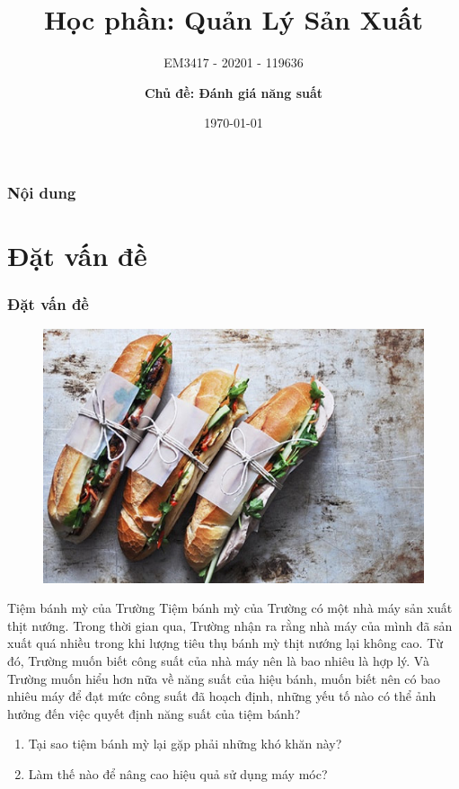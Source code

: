 \documentclass[10pt]{beamer}
\title[Đánh giá năng suất]{Học phần: \textbf{Quản Lý Sản Xuất}}
\subtitle{EM3417 - 20201 - 119636}
\author[EM3417 - 20201 - 119636]{\large {\textbf{Chủ đề: Đánh giá năng suất}}}
\institute[Nhóm 2]{\large {Nhóm 2}}
\date{\today}
\begin{document}
\frame{\titlepage\transsplitverticalout}









\begin{frame}
\label{contents}
\transblindshorizontal
\frametitle{\textbf{Nội dung}}
\tableofcontents
\end{frame}


\section{Đặt vấn đề}
\begin{frame}
\transsplitverticalout
\frametitle{Đặt vấn đề}
\begin{figure}
\includegraphics[scale=0.2]{Figs/banhmi.jpg}
\end{figure}

\begin{block}{Tiệm bánh mỳ của Trường}
Tiệm bánh mỳ của Trường có một nhà máy sản xuất thịt nướng. Trong thời
gian qua, Trường nhận ra rằng nhà máy của mình đã sản xuất quá nhiều trong khi lượng
tiêu thụ bánh mỳ thịt nướng lại không cao. Từ đó, Trường muốn biết công suất của
nhà máy nên là bao nhiêu là hợp lý.
Và Trường muốn hiểu hơn nữa về năng suất của hiệu bánh, muốn biết nên có bao nhiêu máy để đạt mức công suất đã hoạch định, những yếu tố nào có thể ảnh hưởng đến việc quyết
định năng suất của tiệm bánh?
\end{block}

\begin{enumerate}
\item Tại sao tiệm bánh mỳ lại gặp phải những khó khăn này?
\item Làm thế nào để nâng cao hiệu quả sử dụng máy móc?
\end{enumerate}

\end{frame}
\end{document}
